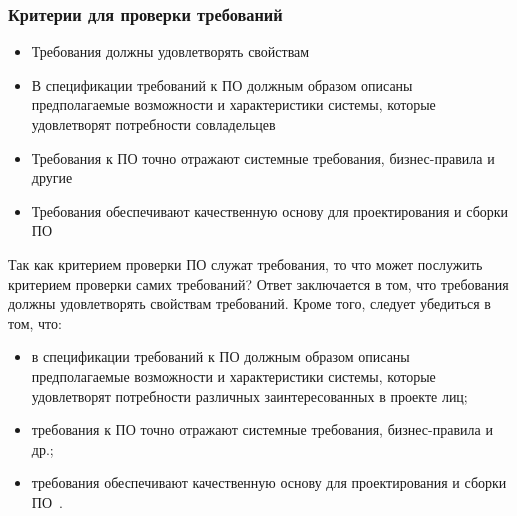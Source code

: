 \documentclass{../industrial-development}
\begin{document}
{\begin{frame} \frametitle {Критерии для проверки требований}
\begin{itemize}
\item Требования должны удовлетворять свойствам
\item В спецификации требований к ПО должным образом описаны предполагаемые возможности и характеристики системы, которые удовлетворят потребности совладельцев
\item Требования к ПО точно отражают системные требования, бизнес-правила и другие
\item Требования обеспечивают качественную основу для проектирования и сборки ПО
\end{itemize}
\end{frame}

\lecturenotes

Так как критерием проверки ПО служат требования, то что может послужить критерием проверки самих требований? Ответ заключается в том, что требования должны удовлетворять свойствам требований. Кроме того, следует убедиться в том, что:
\begin{itemize}
\item в спецификации требований к ПО должным образом описаны предполагаемые возможности и характеристики системы, которые удовлетворят потребности различных заинтересованных в проекте лиц;
\item требования к ПО точно отражают системные требования, бизнес-правила и др.;
\item требования обеспечивают качественную основу для проектирования и сборки ПО~\cite[с.~64]{Maglinec}.
\end{itemize}


}
\end{document}
